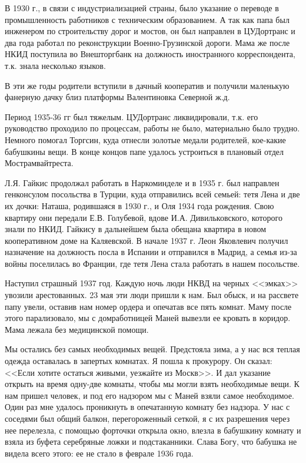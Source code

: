 В  1930 г.,  в связи с  индустриализацией страны, было указание  о переводе  в 
промышленность  работников  с  техническим  образованием.  А так  как  папа был 
инженером по строительству дорог и мостов, он был  направлен в ЦУДортранс и два 
года работал  по  реконструкции  Военно-Грузинской дороги. Мама же  после НКИД 
поступила во Внешторгбанк на должность иностранного корреспондента, т.к.  знала 
несколько языков.

В эти же годы родители вступили в дачный кооператив  и  получили  маленькую 
фанерную дачку близ платформы Валентиновка Северной ж.д.

Период  1935-36 гг  был  тяжелым.  ЦУДортранс  ликвидировали,  т.к.  его 
руководство проходило по процессам,  работы  не было, материально было трудно. 
Немного  помогал Торгсин,  куда  отнесли золотые  медали  родителей,  кое-какие 
бабушкины вещи.  В конце концов  папе  удалось  устроиться  в  плановый отдел 
Мострамвайтреста.

Л.Я. Гайкис  продолжал работать в Наркоминделе  и  в 1935 г. был  направлен 
генконсулом посольства в Турции, куда отправились  всей семьей: тетя Лена  и  две 
их дочки:  Наташа, родившаяся в  1930 г., и Оля  1934 года рождения.  Свою квартиру 
они  передали Е.В. Голубевой, вдове  И.А. Дивильковского, которого знали по НКИД. 
Гайкису  в дальнейшем  была обещана  квартира  в новом кооперативном доме  на 
Каляевской.  В начале  1937 г. Леон Яковлевич  получил  назначение  на  должность 
посла  в Испании  и отправился  в Мадрид,  а семья  из-за  войны  поселилась  во 
Франции, где тетя Лена стала работать в нашем посольстве.

Наступил страшный  1937 год. Каждую  ночь  люди  НКВД  на черных  <<эмках>>
увозили арестованных.  23 мая  эти  люди  пришли к нам. Был  обыск, и на рассвете 
папу увели, оставив  нам номер  ордера  и опечатав  все  пять комнат. Маму после 
этого  парализовало,  мы  с  домработницей  Маней  вывезли  ее  кровать в  коридор. 
Мама лежала без медицинской помощи.

Мы  остались  без  самых необходимых  вещей. Предстояла зима,  а  у  нас  вся 
теплая одежда оставалась в запертых комнатах. Я пошла к  прокурору.  Он сказал: 
<<Если хотите остаться живыми, уезжайте из Москв>>.  И  дал  указание  открыть 
на время  одну-две  комнаты, чтобы  мы  могли  взять  необходимые  вещи.  К  нам 
пришел человек, и под его надзором  мы с  Маней  взяли  самое необходимое. Один 
раз мне удалось проникнуть в  опечатанную  комнату без  надзора. У нас с соседями 
был общий балкон, перегороженный сеткой, я  с их разрешения через нее перелезла, 
с помощью  форточки  открыла  окно,  влезла  в  бабушкину  комнату  и  взяла  из 
буфета серебряные  ложки и подстаканники.  Слава  Богу, что  бабушка  не  видела 
всего этого: ее не стало в феврале  1936 года.

